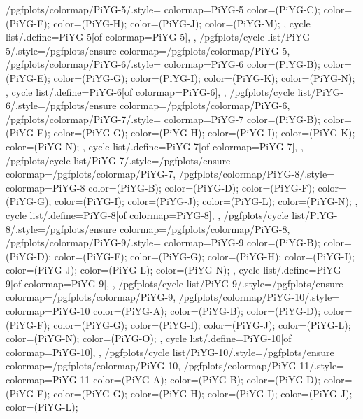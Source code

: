 {  %
  /pgfplots/colormap/PiYG-5/.style={
    colormap={PiYG-5}{
      color=(PiYG-C);
      color=(PiYG-F);
      color=(PiYG-H);
      color=(PiYG-J);
      color=(PiYG-M);
    },
    cycle list/.define={PiYG-5}{[of colormap=PiYG-5]},
  },
  /pgfplots/cycle list/PiYG-5/.style={/pgfplots/ensure colormap={/pgfplots/colormap/PiYG-5}},
  /pgfplots/colormap/PiYG-6/.style={
    colormap={PiYG-6}{
      color=(PiYG-B);
      color=(PiYG-E);
      color=(PiYG-G);
      color=(PiYG-I);
      color=(PiYG-K);
      color=(PiYG-N);
    },
    cycle list/.define={PiYG-6}{[of colormap=PiYG-6]},
  },
  /pgfplots/cycle list/PiYG-6/.style={/pgfplots/ensure colormap={/pgfplots/colormap/PiYG-6}},
  /pgfplots/colormap/PiYG-7/.style={
    colormap={PiYG-7}{
      color=(PiYG-B);
      color=(PiYG-E);
      color=(PiYG-G);
      color=(PiYG-H);
      color=(PiYG-I);
      color=(PiYG-K);
      color=(PiYG-N);
    },
    cycle list/.define={PiYG-7}{[of colormap=PiYG-7]},
  },
  /pgfplots/cycle list/PiYG-7/.style={/pgfplots/ensure colormap={/pgfplots/colormap/PiYG-7}},
  /pgfplots/colormap/PiYG-8/.style={
    colormap={PiYG-8}{
      color=(PiYG-B);
      color=(PiYG-D);
      color=(PiYG-F);
      color=(PiYG-G);
      color=(PiYG-I);
      color=(PiYG-J);
      color=(PiYG-L);
      color=(PiYG-N);
    },
    cycle list/.define={PiYG-8}{[of colormap=PiYG-8]},
  },
  /pgfplots/cycle list/PiYG-8/.style={/pgfplots/ensure colormap={/pgfplots/colormap/PiYG-8}},
  /pgfplots/colormap/PiYG-9/.style={
    colormap={PiYG-9}{
      color=(PiYG-B);
      color=(PiYG-D);
      color=(PiYG-F);
      color=(PiYG-G);
      color=(PiYG-H);
      color=(PiYG-I);
      color=(PiYG-J);
      color=(PiYG-L);
      color=(PiYG-N);
    },
    cycle list/.define={PiYG-9}{[of colormap=PiYG-9]},
  },
  /pgfplots/cycle list/PiYG-9/.style={/pgfplots/ensure colormap={/pgfplots/colormap/PiYG-9}},
  /pgfplots/colormap/PiYG-10/.style={
    colormap={PiYG-10}{
      color=(PiYG-A);
      color=(PiYG-B);
      color=(PiYG-D);
      color=(PiYG-F);
      color=(PiYG-G);
      color=(PiYG-I);
      color=(PiYG-J);
      color=(PiYG-L);
      color=(PiYG-N);
      color=(PiYG-O);
    },
    cycle list/.define={PiYG-10}{[of colormap=PiYG-10]},
  },
  /pgfplots/cycle list/PiYG-10/.style={/pgfplots/ensure colormap={/pgfplots/colormap/PiYG-10}},
  /pgfplots/colormap/PiYG-11/.style={
    colormap={PiYG-11}{
      color=(PiYG-A);
      color=(PiYG-B);
      color=(PiYG-D);
      color=(PiYG-F);
      color=(PiYG-G);
      color=(PiYG-H);
      color=(PiYG-I);
      color=(PiYG-J);
      color=(PiYG-L);
}}}
